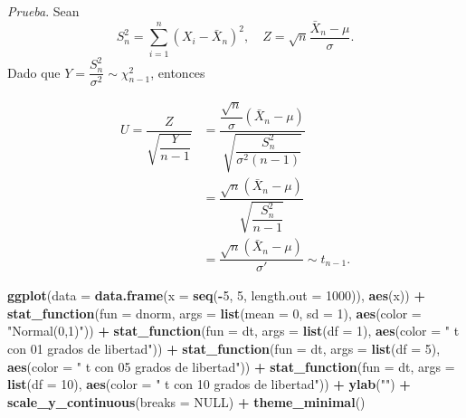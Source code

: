 \documentclass[
  12pt,
]{book}
\newenvironment{Shaded}{\begin{snugshade}}{\end{snugshade}}
\newcommand{\DataTypeTok}[1]{\textcolor[rgb]{0.13,0.29,0.53}{#1}}
\newcommand{\DecValTok}[1]{\textcolor[rgb]{0.00,0.00,0.81}{#1}}
\newcommand{\KeywordTok}[1]{\textcolor[rgb]{0.13,0.29,0.53}{\textbf{#1}}}
\newcommand{\NormalTok}[1]{#1}
\newcommand{\OperatorTok}[1]{\textcolor[rgb]{0.81,0.36,0.00}{\textbf{#1}}}
\newcommand{\OtherTok}[1]{\textcolor[rgb]{0.56,0.35,0.01}{#1}}
\newcommand{\StringTok}[1]{\textcolor[rgb]{0.31,0.60,0.02}{#1}}
\begin{document}
\emph{Prueba}. Sean
\[S_n^2=\sum_{i=1}^n(X_i-\bar X_n)^2, \quad Z = \sqrt n \dfrac{\bar X_n-\mu}{\sigma}. \]
Dado que \(Y = \dfrac{S_n^2}{\sigma^2}\sim \chi^2_{n-1}\), entonces

\begin{align*}
U = \dfrac{Z}{\sqrt{\dfrac Y{n-1}}} & = \dfrac{\dfrac{\sqrt n}\sigma (\bar X_n-\mu)}{\sqrt{\dfrac{S_n^2}{\sigma^2(n-1)}}} \\ & = \dfrac{\sqrt n (\bar X_n-\mu)}{\sqrt{\dfrac{S_n^2}{n-1}}}\\& = \dfrac{\sqrt n (\bar X_n-\mu)}{\sigma'} \sim t_{n-1}.
\end{align*}

\begin{Shaded}
\begin{Highlighting}[]
\KeywordTok{ggplot}\NormalTok{(}\DataTypeTok{data =} \KeywordTok{data.frame}\NormalTok{(}\DataTypeTok{x =} \KeywordTok{seq}\NormalTok{(}\OperatorTok{{-}}\DecValTok{5}\NormalTok{, }\DecValTok{5}\NormalTok{, }\DataTypeTok{length.out =} \DecValTok{1000}\NormalTok{)), }\KeywordTok{aes}\NormalTok{(x)) }\OperatorTok{+}
\StringTok{  }\KeywordTok{stat\_function}\NormalTok{(}\DataTypeTok{fun =}\NormalTok{ dnorm, }\DataTypeTok{args =} \KeywordTok{list}\NormalTok{(}\DataTypeTok{mean =} \DecValTok{0}\NormalTok{, }\DataTypeTok{sd =} \DecValTok{1}\NormalTok{), }\KeywordTok{aes}\NormalTok{(}\DataTypeTok{color =} \StringTok{"Normal(0,1)"}\NormalTok{)) }\OperatorTok{+}
\StringTok{  }\KeywordTok{stat\_function}\NormalTok{(}\DataTypeTok{fun =}\NormalTok{ dt, }\DataTypeTok{args =} \KeywordTok{list}\NormalTok{(}\DataTypeTok{df =} \DecValTok{1}\NormalTok{), }\KeywordTok{aes}\NormalTok{(}\DataTypeTok{color =} \StringTok{" t con 01 grados de libertad"}\NormalTok{)) }\OperatorTok{+}
\StringTok{  }\KeywordTok{stat\_function}\NormalTok{(}\DataTypeTok{fun =}\NormalTok{ dt, }\DataTypeTok{args =} \KeywordTok{list}\NormalTok{(}\DataTypeTok{df =} \DecValTok{5}\NormalTok{), }\KeywordTok{aes}\NormalTok{(}\DataTypeTok{color =} \StringTok{" t con 05 grados de libertad"}\NormalTok{)) }\OperatorTok{+}
\StringTok{  }\KeywordTok{stat\_function}\NormalTok{(}\DataTypeTok{fun =}\NormalTok{ dt, }\DataTypeTok{args =} \KeywordTok{list}\NormalTok{(}\DataTypeTok{df =} \DecValTok{10}\NormalTok{), }\KeywordTok{aes}\NormalTok{(}\DataTypeTok{color =} \StringTok{" t con 10 grados de libertad"}\NormalTok{)) }\OperatorTok{+}
\StringTok{  }\KeywordTok{ylab}\NormalTok{(}\StringTok{""}\NormalTok{) }\OperatorTok{+}
\StringTok{  }\KeywordTok{scale\_y\_continuous}\NormalTok{(}\DataTypeTok{breaks =} \OtherTok{NULL}\NormalTok{) }\OperatorTok{+}
\StringTok{  }\KeywordTok{theme\_minimal}\NormalTok{()}
\end{Highlighting}
\end{Shaded}
\end{document}

